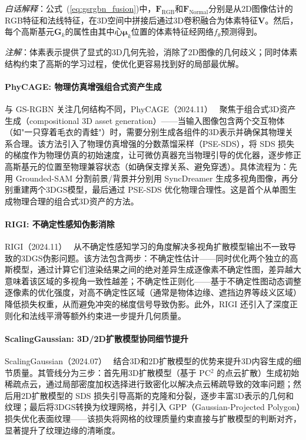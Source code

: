 \textit{白话解释}：公式~(\ref{eq:gsrgbn_fusion})中，$\mathbf{F}_{\mathrm{RGB}}$和$\mathbf{F}_{\mathrm{Normal}}$分别是从2D图像估计的RGB特征和法线特征，在3D空间中拼接后通过3D卷积融合为体素特征$\mathbf{V}$。然后，每个高斯基元$\mathbf{G}_k$的属性由其中心$\boldsymbol{\mu}_k$位置的体素特征经网络$f_\theta$预测得到。

\textit{注解}：体素表示提供了显式的3D几何先验，消除了2D图像的几何歧义；同时体素结构约束了高斯的学习过程，使优化更容易找到好的局部最优解。

\paragraph{PhyCAGE: 物理仿真增强组合式资产生成}

与 GS-RGBN 关注几何结构不同，PhyCAGE（2024.11）~\cite{2411_18548} 聚焦于组合式3D资产生成（compositional 3D asset generation）——当输入图像包含两个交互物体（如"一只穿着毛衣的青蛙"）时，需要分别生成各组件的3D表示并确保其物理关系合理。该方法引入了物理仿真增强的分数蒸馏采样（PSE-SDS），将 SDS 损失的梯度作为物理仿真的初始速度，让可微仿真器充当物理引导的优化器，逐步修正高斯基元的位置至物理兼容状态（如确保支撑关系、避免穿透）。具体流程为：先用 Grounded-SAM 分割前景/背景并分别用 SyncDreamer 生成多视角图像，再分别重建两个3DGS模型，最后通过 PSE-SDS 优化物理合理性。这是首个从单图生成物理合理的组合式3D资产的方法。

\paragraph{RIGI: 不确定性感知伪影消除}

RIGI（2024.11）~\cite{2411_18866} 从不确定性感知学习的角度解决多视角扩散模型输出不一致导致的3DGS伪影问题。该方法包含两步：不确定性估计——同时优化两个独立的高斯模型，通过计算它们渲染结果之间的绝对差异生成逐像素不确定性图，差异越大意味着该区域的多视角一致性越差；不确定性正则化——基于不确定性图动态调整逐像素的优化强度，对高不确定性区域（通常是物体边缘、遮挡边界等歧义区域）降低损失权重，从而避免冲突的梯度信号导致伪影。此外，RIGI 还引入了深度正则化和法线平滑等额外约束进一步提升几何质量。

\paragraph{ScalingGaussian: 3D/2D扩散模型协同细节提升}

ScalingGaussian（2024.07）~\cite{2407_19035} 结合3D和2D扩散模型的优势来提升3D内容生成的细节质量。其管线分为三步：首先用3D扩散模型（基于 PC$^2$ 的点云扩散）生成初始稀疏点云，通过局部密度加权选择进行致密化以解决点云稀疏导致的效率问题；然后用2D扩散模型的 SDS 损失引导高斯的克隆和分裂，逐步丰富3D表示的几何和纹理；最后将3DGS转换为纹理网格，并引入 GPP（Gaussian-Projected Polygon）损失优化表面纹理——该损失将网格的纹理质量约束直接与扩散模型的判断对齐，显著提升了纹理边缘的清晰度。

